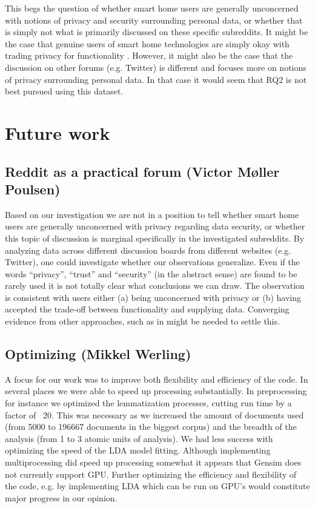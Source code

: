 \documentclass{article}
\begin{document}
This begs the question of whether smart home users are generally unconcerned with notions of privacy and security surrounding personal data, or whether that is simply not what is primarily discussed on these specific subreddits. It might be the case that genuine users of smart home technologies are simply okay with trading privacy for functionality \cite{hubert2020take, tabassum2019investigating}. However, it might also be the case that the discussion on other forums (e.g. Twitter) is different and focuses more on notions of privacy surrounding personal data. In that case it would seem that RQ2 is not best pursued using this dataset. 

    \section{Future work}
    \subsection{Reddit as a practical forum (Victor Møller Poulsen)}
    Based on our investigation we are not in a position to tell whether smart home users
are generally unconcerned with privacy regarding data security, or whether this topic
of discussion is marginal specifically in the investigated subreddits. By analyzing data
across different discussion boards from different websites (e.g. Twitter), one could
investigate whether our observations generalize. Even if the words “privacy”, “trust” and “security” (in the abstract sense) are found to be rarely used it is not totally clear what conclusions we can draw. The observation is consistent with users either (a) being unconcerned with privacy or (b) having accepted the trade-off between functionality and supplying data. Converging evidence from other approaches, such as in  might be needed to settle this.
    \subsection{Optimizing (Mikkel Werling)}
    A focus for our work was to improve both flexibility and efficiency of the code. In several places we were able to speed up processing substantially. In preprocessing for instance we optimized the lemmatization processes, cutting run time by a factor of ~20. This was necessary as we increased the amount of documents used (from 5000 to 196667 documents in the biggest corpus) and the breadth of the analysis (from 1 to 3 atomic units of analysis). We had less success with optimizing the speed of the LDA model fitting. Although implementing multiprocessing did speed up processing somewhat it appears that Gensim does not currently support GPU. Further optimizing the efficiency and flexibility of the code, e.g. by implementing LDA which can be run on GPU’s would constitute major progress in our opinion.
\end{document}
